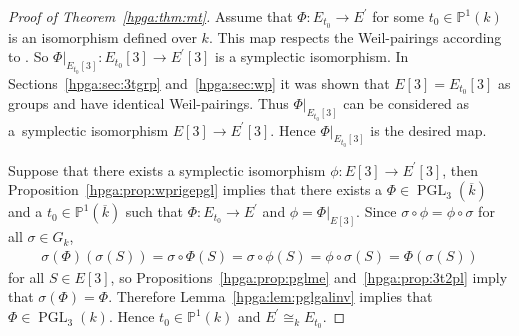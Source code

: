 \documentclass[11pt]{article}
\newcommand{\mpp}{{\mathbb{P}}}
\newcommand{\msetp}[1]{{\left({#1}\right)}}					%
\newcommand{\msets}[1]{{\left[{#1}\right]}}					%
\newcommand{\mac}[1]{{\overline{#1}}}
\newcommand{\mpgl}[2]{{\operatorname{PGL}_{#1}}\msetp{#2}}	%
\newcommand{\mps}[2]{{\mpp^{#1}\msetp{#2}}}						%
\newcommand{\mres}[2]{{\left.{#1}\right|_{#2}}}					%
\numberwithin{equation}{section}
\begin{document}
\begin{proof}[Proof of Theorem~\ref{hpga:thm:mt}] Assume that $\Phi\colon E_{t_0}\rightarrow E^\prime$ for some $t_0\in\mps{1}{k}$ is an isomorphism defined over $k$. This map respects the Weil-pairings according to
\cite[Proposition III.8.2]{silverman1985}. So $\mres{\Phi}{E_{t_0}\msets{3}}\colon E_{t_0}\msets{3}\rightarrow E^\prime\msets{3}$ is a symplectic isomorphism. In Sections~\ref{hpga:sec:3tgrp} and~\ref{hpga:sec:wp} it was shown that $E\msets {3}=E_{t_0}\msets{3}$ as groups and have identical Weil-pairings. Thus $\mres {\Phi}{E_{t_0}\msets{3}}$ can be considered as a~symplectic isomorphism $E\msets {3}\rightarrow E^\prime\msets{3}$. Hence $\mres{\Phi}{E_{t_0}\msets{3}}$ is the desired map.

Suppose that there exists a symplectic isomorphism $\phi\colon E\msets{3}\rightarrow E^\prime\msets{3}$, then Proposition~\ref{hpga:prop:wprigepgl} implies that there exists a $\Phi\in\mpgl{3}{\mac{k}}$ and a $t_0\in\mps{1}{\mac{k}}$ such that $\Phi\colon E_{t_0}\rightarrow E^\prime$ and $\phi=\mres{\Phi}{E\msets{3}}$. Since $\sigma\circ\phi=\phi\circ\sigma$ for all $\sigma\in G_k$,
\begin{gather*}
\sigma\msetp{\Phi}\msetp{\sigma\msetp{S}} =\sigma\circ\Phi\msetp{S} =\sigma\circ\phi\msetp{S} =\phi\circ\sigma\msetp{S} =\Phi\msetp{\sigma\msetp{S}}
\end{gather*}
for all $S\in E\msets{3}$, so Propositions~\ref{hpga:prop:pglme} and~\ref{hpga:prop:3t2pl} imply that $\sigma\msetp{\Phi}=\Phi$. Therefore Lemma~\ref{hpga:lem:pglgalinv} implies that $\Phi\in\mpgl{3}{k}$. Hence $t_0\in\mps{1}{k}$ and $E^\prime\cong_kE_{t_0}$.
\end{proof}
\end{document}
